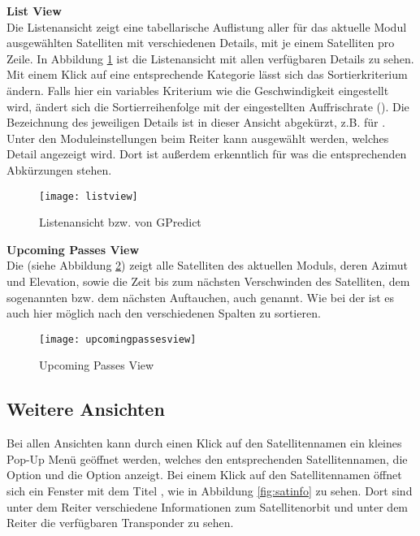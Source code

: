 \clearpage

\textbf{List View}\\
Die Listenansicht zeigt eine tabellarische Auflistung aller für das aktuelle Modul ausgewählten Satelliten mit verschiedenen Details, mit je einem Satelliten pro Zeile. In Abbildung \ref{fig:listview} ist die Listenansicht mit allen verfügbaren Details zu sehen. Mit einem Klick auf eine entsprechende Kategorie lässt sich das Sortierkriterium ändern. Falls hier ein variables Kriterium wie die Geschwindigkeit eingestellt wird, ändert sich die Sortierreihenfolge mit der eingestellten Auffrischrate (). Die Bezeichnung des jeweiligen Details ist in dieser Ansicht abgekürzt, z.B.  für . Unter den Moduleinstellungen beim Reiter  kann ausgewählt werden, welches Detail angezeigt wird. Dort ist außerdem erkenntlich für was die entsprechenden Abkürzungen stehen.

\begin{figure}[h]
	\centering
	\texttt{[image: listview]}
	\caption{Listenansicht bzw.  von GPredict}
	\label{fig:listview} 
\end{figure}

\textbf{Upcoming Passes View}\\
Die  (siehe Abbildung \ref{fig:upcomingpassesview}) zeigt alle Satelliten des aktuellen Moduls, deren Azimut und Elevation, sowie die Zeit bis zum nächsten Verschwinden des Satelliten, dem sogenannten  bzw. dem nächsten Auftauchen, auch  genannt. Wie bei der  ist es auch hier möglich nach den verschiedenen Spalten zu sortieren.

\begin{figure}[h]
	\centering
	\texttt{[image: upcomingpassesview]}
	\caption{Upcoming Passes View}
	\label{fig:upcomingpassesview} 
\end{figure}

\clearpage

\subsection{Weitere Ansichten}

Bei allen Ansichten kann durch einen Klick auf den Satellitennamen ein kleines Pop-Up Menü geöffnet werden, welches den entsprechenden Satellitennamen, die Option  und die Option  anzeigt. Bei einem Klick auf den Satellitennamen öffnet sich ein Fenster mit dem Titel , wie in Abbildung \ref{fig:satinfo} zu sehen. Dort sind unter dem Reiter  verschiedene Informationen zum Satellitenorbit und unter dem Reiter  die verfügbaren Transponder zu sehen.

